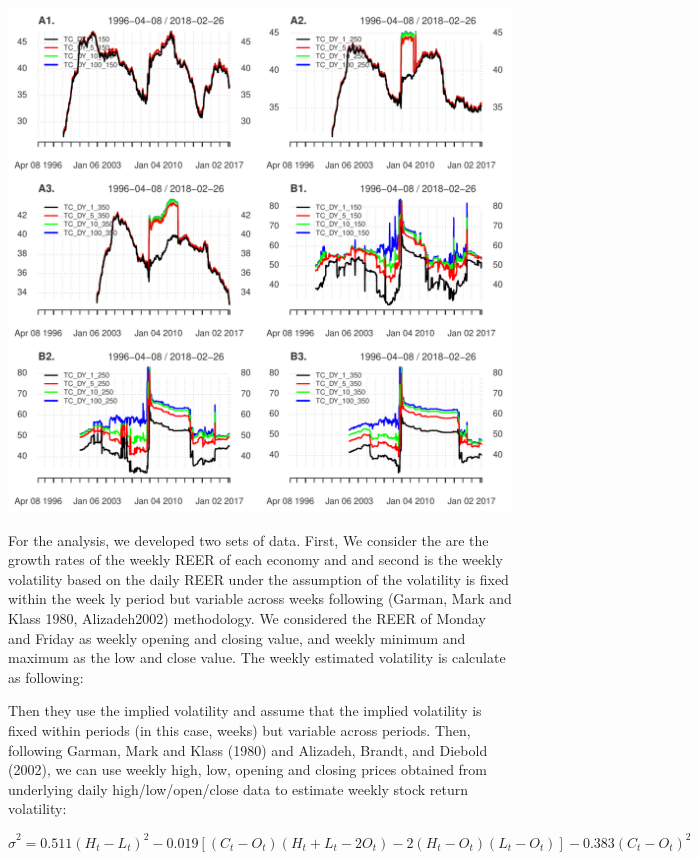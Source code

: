 \documentclass[]{elsarticle} %
\makeatletter
\def\maxwidth{\ifdim\Gin@nat@width>\linewidth\linewidth
\else\Gin@nat@width\fi}
\let\Oldincludegraphics\includegraphics
\renewcommand{\includegraphics}[1]{\Oldincludegraphics[width=\maxwidth]{#1}}
\makeatother
\begin{document}
\includegraphics{Main_files/figure-latex/unnamed-chunk-6-1.pdf}

For the analysis, we developed two sets of data. First, We consider the
are the growth rates of the weekly REER of each economy and and second
is the weekly volatility based on the daily REER under the assumption of
the volatility is fixed within the week ly period but variable across
weeks following (Garman, Mark and Klass 1980, Alizadeh2002) methodology.
We considered the REER of Monday and Friday as weekly opening and
closing value, and weekly minimum and maximum as the low and close
value. The weekly estimated volatility is calculate as following:

Then they use the implied volatility and assume that the implied
volatility is fixed within periods (in this case, weeks) but variable
across periods. Then, following Garman, Mark and Klass (1980) and
Alizadeh, Brandt, and Diebold (2002), we can use weekly high, low,
opening and closing prices obtained from underlying daily
high/low/open/close data to estimate weekly stock return volatility:

\[{{\hat{\sigma }}^{2}}=0.511{{\left( {{H}_{t}}-{{L}_{t}} \right)}^{2}}-0.019\left[ \left( {{C}_{t}}-{{O}_{t}} \right)\left( {{H}_{t}}+{{L}_{t}}-2{{O}_{t}} \right)-2\left( {{H}_{t}}-{{O}_{t}} \right)\left( {{L}_{t}}-{{O}_{t}} \right) \right]-0.383{{\left( {{C}_{t}}-{{O}_{t}} \right)}^{2}}\]
\end{document}
